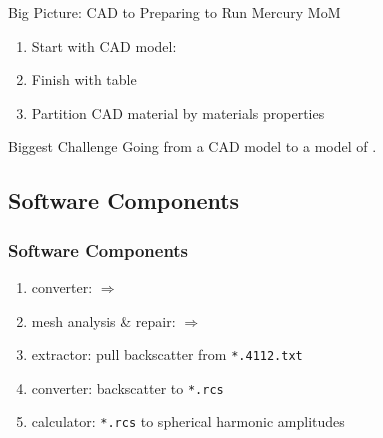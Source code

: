 \begin{frame}{Big Picture: CAD to \geo}
Preparing to Run Mercury MoM
\begin{enumerate}
	\item Start with CAD model: \stl
	\item Finish with table \geo
	\item Partition CAD material by materials properties
\end{enumerate}
\end{frame}

\begin{frame}{Biggest Challenge}
Going from a CAD model to a model of .
\end{frame}

\subsection{Software Components}
\begin{frame}\frametitle{Software Components}
\begin{enumerate}
	\item converter: \obj $\Rightarrow$ \facet
	\item mesh analysis \& repair: \obj $\Rightarrow$ \facet
	\item extractor: pull backscatter from \texttt{*.4112.txt}
	\item converter: backscatter to \texttt{*.rcs}
	\item calculator: \texttt{*.rcs} to spherical harmonic amplitudes
\end{enumerate}
\end{frame}

\endinput  %
